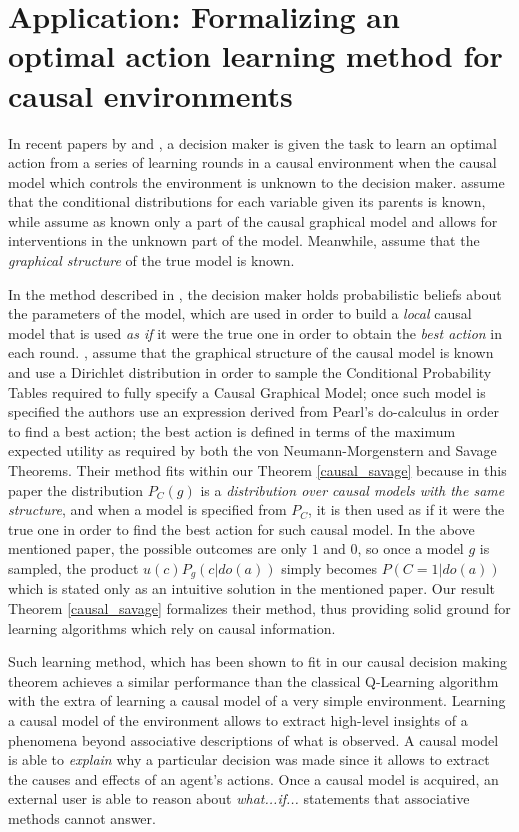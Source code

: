 \documentclass[review]{elsarticle}
\begin{document}
\section{Application: Formalizing an optimal action learning method for causal environments}
\label{optimal_action}
In recent papers by \cite{lattimoreNIPS2016,sen2017identifying} and \cite{gonzalez2018playing}, a decision maker is given the task to learn an optimal action from a series of learning rounds in a causal environment when the causal model which controls the environment is unknown to the decision maker. \cite{lattimoreNIPS2016} assume that the conditional distributions for each variable given its parents is known, while \cite{sen2017identifying} assume as known only a part of the causal graphical model and allows for interventions in the unknown part of the model. Meanwhile, \cite{gonzalez2018playing} assume that the \textit{graphical structure} of the true model is known. 

In the method described in \cite{gonzalez2018playing}, the decision maker holds probabilistic beliefs about the parameters of the model, which are used in order to build a \textit{local} causal model that is used \textit{as if} it were the true one in order to obtain the \textit{best action} in each round. \cite{gonzalez2018playing}, assume that the graphical structure of the causal model is known and use a Dirichlet distribution in order to sample the Conditional Probability Tables required to fully specify a Causal Graphical Model; once such model is specified the authors use an expression derived from Pearl's do-calculus in order to find a best action; the best action is defined in terms of the maximum expected utility as required by both the von Neumann-Morgenstern and Savage Theorems. Their method fits within our Theorem \ref{causal_savage} because in this paper the distribution $P_C(g)$ is a \textit{distribution over causal models with the same structure}, and when a model is specified from $P_C$, it is then used as if it were the true one in order to find the best action for such causal model. In the above mentioned paper, the possible outcomes are only $1$ and $0$, so once a model $g$ is sampled, the product $u(c)P_g(c|do(a))$ simply becomes $P(C=1 | do(a))$ which is stated only as an intuitive solution in the mentioned paper. Our result Theorem \ref{causal_savage} formalizes their method, thus providing solid ground for learning algorithms which rely on causal information.

Such learning method, which has been shown to fit in our causal decision making theorem achieves a similar performance than the classical Q-Learning algorithm with the extra of learning a causal model of a very simple environment. Learning a causal model of the environment allows to extract high-level insights of a phenomena beyond associative descriptions of what is observed. A causal model is able to \textit{explain} why a particular decision was made since it allows to extract the causes and effects of an agent's actions. Once a causal model is acquired, an external user is able to reason about \textit{what...if...} statements that associative methods cannot answer.  
\end{document}

